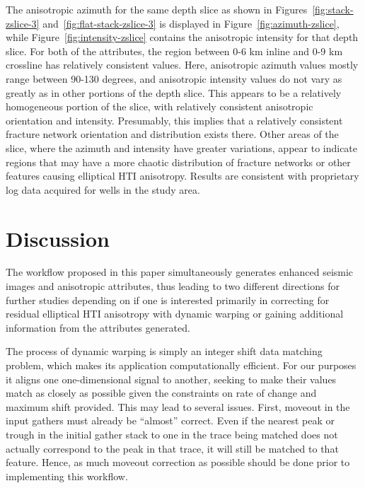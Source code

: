 The anisotropic azimuth for the same depth slice as shown in Figures~\ref{fig:stack-zslice-3} and~\ref{fig:flat-stack-zslice-3} is displayed in Figure~\ref{fig:azimuth-zslice}, while Figure~\ref{fig:intensity-zslice} contains the anisotropic intensity for that depth slice.  For both of the attributes, the region between 0-6 km inline and 0-9 km crossline has relatively consistent values. Here, anisotropic azimuth values mostly range between 90-130 degrees, and anisotropic intensity values do not vary as greatly as in other portions of the depth slice.  This appears to be a relatively homogeneous portion of the slice, with relatively consistent anisotropic orientation and intensity.  Presumably, this implies that a relatively consistent fracture network orientation and distribution exists there.  Other areas of the slice, where the azimuth and intensity have greater variations, appear to indicate regions that may have a more chaotic distribution of fracture networks or other features causing elliptical HTI anisotropy.  Results are consistent with proprietary log data acquired for wells in the study area.


\section{Discussion}
The workflow proposed in this paper simultaneously generates enhanced seismic images and anisotropic attributes, thus leading to two different directions for further studies depending on if one is interested primarily in correcting for residual elliptical HTI anisotropy with dynamic warping or gaining additional information from the attributes generated.  

The process of dynamic warping is simply an integer shift data matching problem, which makes its application computationally efficient. 
For our purposes it aligns one one-dimensional signal to another, seeking to make their values match as closely as possible given the constraints on rate of change and maximum shift provided. This may lead to several issues.  
First, moveout in the input gathers must already be ``almost'' correct.  Even if the nearest peak or trough in the initial gather stack to one in the trace being matched does not actually correspond to the peak in that trace, it will still be matched to that feature.  Hence, as much moveout correction as possible should be done prior to implementing this workflow.  

